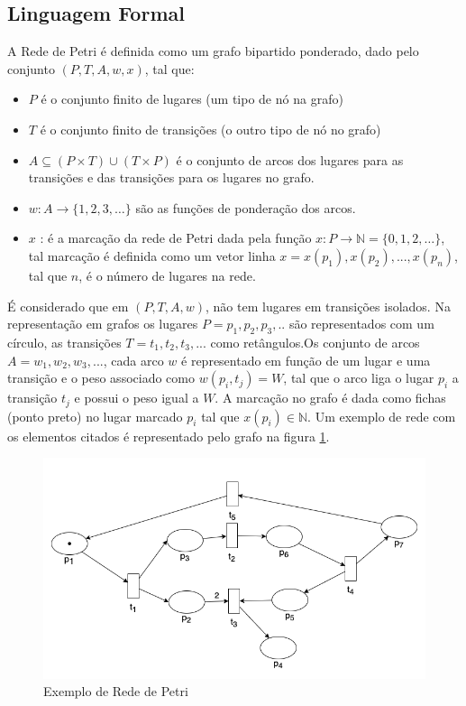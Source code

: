 \subsection{Linguagem Formal}
A Rede de Petri é definida como um grafo bipartido ponderado, dado pelo conjunto $(P,T,A,w,x)$, tal que:
\begin{itemize}
    \item $P$ é o conjunto finito de lugares (um tipo de nó na grafo)
    \item $T$ é o conjunto finito de transições (o outro tipo de nó no grafo)
    \item $A \subseteq (P \times T) \cup (T \times P)$ é o conjunto de arcos dos lugares para as transições e das transições para os lugares no grafo.
    \item  $w : A \rightarrow \{1, 2, 3, \ldots\}$ são as funções de ponderação dos arcos.
    \item $x$ : é a marcação da rede de Petri dada pela função $x : P \rightarrow \mathbb{N} = \{0, 1, 2, \ldots\}$, tal marcação é definida como um vetor linha $x = x(p_1), x(p_2), ..., x(p_n)$, tal que $n$, é o número de lugares na rede.
\end{itemize}
É considerado que em $(P,T,A,w)$, não tem lugares em transições isolados.
Na representação em grafos os lugares $P = {p_1,p_2,p_3, ..}$ são representados com um círculo, as transições $T = {t_1,t_2,t_3,...}$ como retângulos.Os conjunto de arcos $A = {w_1,w_2,w_3,...}$, cada arco $w$ é representado em função de um lugar e uma transição e o peso associado como $w(p_i,t_j) = W$, tal que o arco liga o lugar $p_i$ a transição $t_j$ e possui o peso igual a $W$. A marcação no grafo é dada como fichas (ponto preto) no lugar marcado $p_i$ tal que $x(p_i) \in \mathbb{N}$.
Um exemplo de rede com os elementos citados é representado pelo grafo na figura \ref{fig:ex_rp}.

\begin{figure}[ht]
    \includegraphics[scale=0.6]{figures/Petri/exemplo_rp.png}
    \caption{Exemplo de Rede de Petri}
    \label{fig:ex_rp}
\end{figure}

